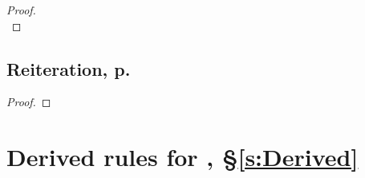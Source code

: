 \begin{multicols}{2}
\begin{proof}
\\	
	 
\end{proof}

\subsection{Reiteration, p.\ \pageref{reit}}

\begin{proof}
	\have[\ ]{}{\vdots}
	 
\end{proof}


\end{multicols}


\section*{Derived rules for \TFL, §\ref{s:Derived}}
